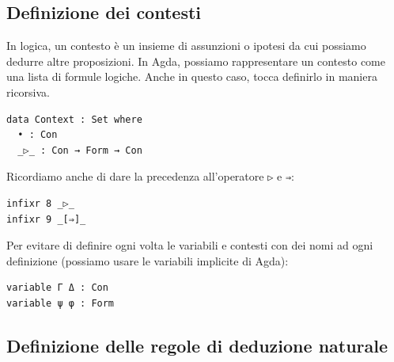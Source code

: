 \documentclass[a4paper]{article}
\theoremstyle{definition}
\theoremstyle{remark}
\begin{document}
\subsection{Definizione dei contesti}
In logica, un contesto è un insieme di assunzioni o ipotesi da cui possiamo dedurre altre proposizioni.
In Agda, possiamo rappresentare un contesto come una lista di formule logiche. Anche in questo
caso, tocca definirlo in maniera ricorsiva.
\begin{verbatim}
data Context : Set where
  • : Con
  _▷_ : Con → Form → Con
\end{verbatim}
Ricordiamo anche di dare la precedenza all'operatore \texttt{▷} e \texttt{⇒}:
\begin{verbatim}
infixr 8 _▷_
infixr 9 _[⇒]_
\end{verbatim}
Per evitare di definire ogni volta le variabili e contesti con dei nomi ad ogni definizione 
(possiamo usare le variabili implicite di Agda):
\begin{verbatim}
variable Γ Δ : Con
variable ψ φ : Form
\end{verbatim}

\subsection{Definizione delle regole di deduzione naturale}
\end{document}

